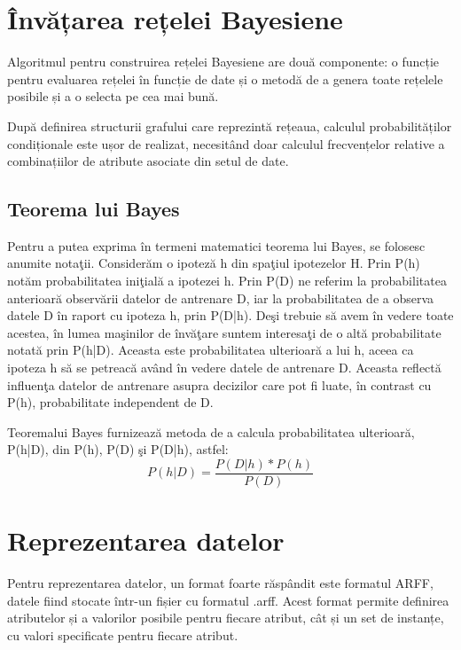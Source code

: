 \section{Învățarea rețelei Bayesiene}

Algoritmul pentru construirea rețelei Bayesiene are două componente: o funcție pentru evaluarea rețelei în funcție de date și o metodă de a genera toate rețelele posibile și a o selecta pe cea mai bună.

După definirea structurii grafului care reprezintă rețeaua, calculul probabilităților condiționale este ușor de realizat, necesitând doar calculul frecvențelor relative a combinațiilor de atribute asociate din setul de date.

\subsection{Teorema lui Bayes}

Pentru a putea exprima în termeni matematici teorema lui Bayes, se folosesc anumite  notaţii.  Considerăm  o  ipoteză  h  din  spaţiul  ipotezelor  H.  Prin  P(h)  notăm probabilitatea iniţială a ipotezei h. Prin P(D) ne referim la probabilitatea anterioară observării datelor de antrenare D, iar la probabilitatea de a observa datele D în raport cu ipoteza h, prin P(D|h).  Deşi  trebuie  să  avem  în  vedere  toate  acestea,  în  lumea  maşinilor  de  învăţare  suntem interesaţi de o altă probabilitate notată prin P(h|D). Aceasta este probabilitatea ulterioară a lui h, aceea ca ipoteza h să se petreacă având în vedere datele de antrenare D. Aceasta reflectă influenţa datelor de antrenare  asupra decizilor care pot fi luate, în contrast cu P(h), probabilitate independent de D.

Teoremalui  Bayes furnizează metoda de a calcula probabilitatea ulterioară, P(h|D), din P(h), P(D) şi P(D|h), astfel:
\[
	P(h|D)=\frac{P(D|h)*P(h)}{P(D)}
\]

\section{Reprezentarea datelor}

Pentru reprezentarea datelor, un format foarte răspândit este formatul ARFF, datele fiind stocate într-un fișier cu formatul .arff. Acest format permite definirea atributelor și a valorilor posibile pentru fiecare atribut, cât și un set de instanțe, cu valori specificate pentru fiecare atribut.

